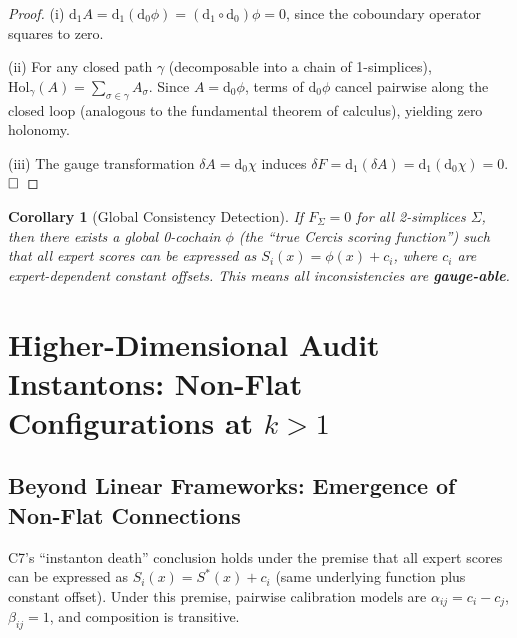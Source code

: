 \documentclass[12pt,a4paper]{article}
\theoremstyle{plain}
\newtheorem{corollary}[theorem]{Corollary}
\theoremstyle{definition}
\theoremstyle{remark}
\newcommand{\dd}{\mathrm{d}}
\newcommand{\hol}{\mathrm{Hol}}
\begin{document}
\begin{proof}
(i) $\dd_1 A = \dd_1(\dd_0 \phi) = (\dd_1 \circ \dd_0)\phi = 0$, since the coboundary operator squares to zero.

(ii) For any closed path $\gamma$ (decomposable into a chain of 1-simplices), $\hol_\gamma(A) = \sum_{\sigma \in \gamma} A_\sigma$. Since $A = \dd_0 \phi$, terms of $\dd_0 \phi$ cancel pairwise along the closed loop (analogous to the fundamental theorem of calculus), yielding zero holonomy.

(iii) The gauge transformation $\delta A = \dd_0 \chi$ induces $\delta F = \dd_1(\delta A) = \dd_1(\dd_0 \chi) = 0$. $\hfill\square$
\end{proof}

\begin{corollary}[Global Consistency Detection]
\label{cor:C7_corollary}
If $F_\Sigma = 0$ for all 2-simplices $\Sigma$, then there exists a global 0-cochain $\phi$ (the ``true Cercis scoring function'') such that all expert scores can be expressed as $S_i(x) = \phi(x) + c_i$, where $c_i$ are expert-dependent constant offsets. This means all inconsistencies are \textbf{gauge-able}.
\end{corollary}

\section{Higher-Dimensional Audit Instantons: Non-Flat Configurations at $k>1$}
\label{sec:nonflat}

\subsection{Beyond Linear Frameworks: Emergence of Non-Flat Connections}
\label{sec:beyond_exact}

C7's ``instanton death'' conclusion holds under the premise that all expert scores can be expressed as $S_i(x) = S^*(x) + c_i$ (same underlying function plus constant offset). Under this premise, pairwise calibration models are $\alpha_{ij} = c_i - c_j$, $\beta_{ij} = 1$, and composition is transitive.
\end{document}
